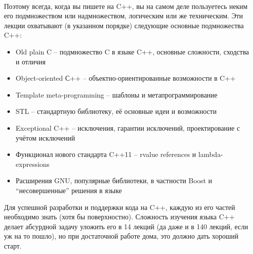 \documentclass[a4paper,12pt,oneside]{article}
\begin{document}
\paragraph{}
Поэтому всегда, когда вы пишете на C++, вы на самом деле пользуетесь неким его подмножеством или надмножеством, логическим или же техническим. Эти лекции охватывают (в указанном порядке) следующие основные подмножества C++:
\begin{itemize}
\item
Old plain C – подмножество C в языке C++, основные сложности, сходства и отличия
\item
Object-oriented С++ – объектно-ориентированные возможности в C++
\item
Template meta-programming – шаблоны и метапрограммирование
\item
STL – стандартную библиотеку, её основные идеи и возможности
\item
Exceptional C++ – исключения, гарантии исключений, проектирование с учётом исключений
\item
Функционал нового стандарта C++11 – rvalue references и  lambda-expressions
\item
Расширения GNU, популярные библиотеки, в частности Boost и ``несовершенные'' решения в языке
\end{itemize}
Для успешной разработки и поддержки кода на C++, каждую из его частей необходимо знать (хотя бы поверхностно). Сложность изучения языка C++ делает абсурдной задачу уложить его в 14 лекций (да даже и в 140 лекций, если уж на то пошло), но при достаточной работе дома, это должно дать хороший старт.
\end{document}
